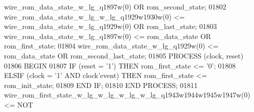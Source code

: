 \begin{DoxyCode}
{{      wire_rom_data_state_w_lg_q1897w}\textcolor{vhdlchar}{(}\textcolor{vhdllogic}{}\textcolor{vhdllogic}{0}\textcolor{vhdlchar}{)} \textcolor{keywordflow}{OR} \textcolor{vhdlchar}{rom_second_state};
01802     \textcolor{vhdlchar}{wire_rom_data_state_w_lg_w_lg_q1929w1930w}\textcolor{vhdlchar}{(}\textcolor{vhdllogic}{}\textcolor{vhdllogic}{0}\textcolor{vhdlchar}{)} \textcolor{vhdlchar}{<=} \textcolor{vhdlchar}{
      wire_rom_data_state_w_lg_q1929w}\textcolor{vhdlchar}{(}\textcolor{vhdllogic}{}\textcolor{vhdllogic}{0}\textcolor{vhdlchar}{)} \textcolor{keywordflow}{OR} \textcolor{vhdlchar}{rom_last_state};
01803     \textcolor{vhdlchar}{wire_rom_data_state_w_lg_q1897w}\textcolor{vhdlchar}{(}\textcolor{vhdllogic}{}\textcolor{vhdllogic}{0}\textcolor{vhdlchar}{)} \textcolor{vhdlchar}{<=} \textcolor{vhdlchar}{rom_data_state} \textcolor{keywordflow}{OR} \textcolor{vhdlchar}{rom_first_state};
01804     \textcolor{vhdlchar}{wire_rom_data_state_w_lg_q1929w}\textcolor{vhdlchar}{(}\textcolor{vhdllogic}{}\textcolor{vhdllogic}{0}\textcolor{vhdlchar}{)} \textcolor{vhdlchar}{<=} \textcolor{vhdlchar}{rom_data_state} \textcolor{keywordflow}{OR} \textcolor{vhdlchar}{
      rom_second_last_state};
01805     \textcolor{keywordflow}{PROCESS} (clock, reset)
01806 \textcolor{vhdlkeyword}{    BEGIN}
01807         \textcolor{keywordflow}{IF} \textcolor{vhdlchar}{(}\textcolor{vhdlchar}{reset} \textcolor{vhdlchar}{=} \textcolor{vhdlchar}{'}\textcolor{vhdllogic}{}\textcolor{vhdllogic}{1}\textcolor{vhdlchar}{'}\textcolor{vhdlchar}{)} \textcolor{keywordflow}{THEN} \textcolor{vhdlchar}{rom_first_state} \textcolor{vhdlchar}{<=} \textcolor{vhdlchar}{'}\textcolor{vhdllogic}{}\textcolor{vhdllogic}{0}\textcolor{vhdlchar}{'};
01808         \textcolor{keywordflow}{ELSIF} \textcolor{vhdlchar}{(}\textcolor{vhdlchar}{clock} \textcolor{vhdlchar}{=} \textcolor{vhdlchar}{'}\textcolor{vhdllogic}{}\textcolor{vhdllogic}{1}\textcolor{vhdlchar}{'} \textcolor{keywordflow}{AND} \textcolor{vhdlchar}{clock}\textcolor{vhdlchar}{'}\textcolor{vhdlkeyword}{event}\textcolor{vhdlchar}{)} \textcolor{keywordflow}{THEN} \textcolor{vhdlchar}{rom_first_state} \textcolor{vhdlchar}{<=} \textcolor{vhdlchar}{
      rom_init_state};
01809         \textcolor{keywordflow}{END} \textcolor{keywordflow}{IF};
01810     \textcolor{keywordflow}{END} \textcolor{keywordflow}{PROCESS};
01811     \textcolor{vhdlchar}{wire_rom_first_state_w_lg_w_lg_w_lg_w_lg_q1943w1944w1945w1947w}\textcolor{vhdlchar}{(}\textcolor{vhdllogic}{}\textcolor{vhdllogic}{0}\textcolor{vhdlchar}{)} \textcolor{vhdlchar}{<=} \textcolor{keywordflow}{NOT} \textcolor{vhdlchar}{
}}
\end{DoxyCode}
